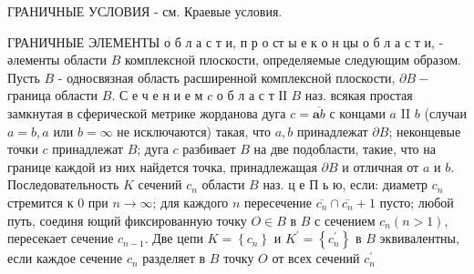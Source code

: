 \documentclass[10pt]{article}
\begin{document}
ГРАНИЧНЫЕ УСЛОВИЯ - см. Краевые условия.



ГРАНИЧНЫЕ ЭЛЕМЕНТЫ о б л а с т и, п р о ст ы е к о н цы о б л а с т и, - әлементы области $B$ комплексной плоскости, определяемые следующим образом. Пусть $B$ - односвязная область расширенной комплексной плоскости, $\partial B-$ граница области $B$. С е ч е н и е м $c$ о б л а с т ІІ $B$ наз. всякая простая замкнутая в сферической метрике жорданова дуга $c=\overline{\boldsymbol{a} b}$ с концами $a$ II $b$ (случаи $a=b, a$ или $b=\infty$ не исключаются) такая, что $a, b$ принадлежат $\partial B$; неконцевые точки $c$ принадлежат $B$; дуга $c$ разбивает $B$ на две подобласти, такие, что на границе каждой из них найдется точка, принадлежащая $\partial B$ и отличная от $a$ и $b$. Последовательность $K$ сечений $c_{n}$ области $B$ наз. ц е П ь ю, если: диаметр $c_{n}$ стремится к 0 при $n \rightarrow \infty$; для каждого $n$ пересечение $\overline{c_{n}} \cap \overline{c_{n}}+1$ пусто; любой путь, соединя ющий фиксированную точку $O \in B$ в $B$ с сечением $c_{n}(n>1)$, пересекает сечение $c_{n-1}$. Две цепи $K=\left\{c_{n}\right\}$ и $K^{\prime}=\left\{c_{n}^{\prime}\right\}$ в $B$ эквивалентны, если каждое сечение $c_{n}$ разделяет в $B$ точку $O$ от всех сечений $c_{n}^{\prime}$
\end{document}
